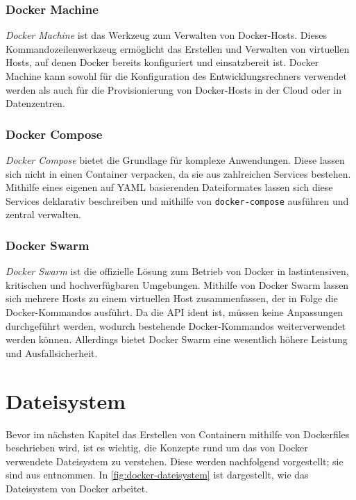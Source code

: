 \subsubsection{Docker Machine}
\label{sec:docker-machine}
\emph{Docker Machine} ist das Werkzeug zum Verwalten von Docker-Hosts.
Dieses Kommandozeilenwerkzeug ermöglicht das Erstellen und Verwalten von virtuellen Hosts, auf denen Docker bereits konfiguriert und einsatzbereit ist.
Docker Machine kann sowohl für die Konfiguration des Entwicklungsrechners verwendet werden als auch für die Provisionierung von Docker-Hosts in der Cloud oder in Datenzentren.
\subsubsection{Docker Compose}
\label{sec:docker-compose}
\emph{Docker Compose} bietet die Grundlage für komplexe Anwendungen.
Diese lassen sich nicht in einen Container verpacken, da sie aus zahlreichen Services bestehen.
Mithilfe eines eigenen auf YAML basierenden Dateiformates lassen sich diese Services deklarativ beschreiben und mithilfe von \texttt{docker-compose} ausführen und zentral verwalten.
\subsubsection{Docker Swarm}
\label{sec:docker-swarm}
\emph{Docker Swarm} ist die offizielle Lösung zum Betrieb von Docker in lastintensiven, kritischen und hochverfügbaren Umgebungen.
Mithilfe von Docker Swarm lassen sich mehrere Hosts zu einem virtuellen Host zusammenfassen, der in Folge die Docker-Kommandos ausführt.
Da die API ident ist, müssen keine Anpassungen durchgeführt werden, wodurch bestehende Docker-Kommandos weiterverwendet werden können.
Allerdings bietet Docker Swarm eine wesentlich höhere Leistung und Ausfallsicherheit.


\section{Dateisystem}
\label{sec:dateisystem}
Bevor im nächsten Kapitel das Erstellen von Containern mithilfe von Dockerfiles beschrieben wird, ist es wichtig, die Konzepte rund um das von Docker verwendete Dateisystem zu verstehen.
Diese werden nachfolgend vorgestellt; sie sind aus \autocite{docker-filesystem:online} entnommen.
In \cref{fig:docker-dateisystem} ist dargestellt, wie das Dateisystem von Docker arbeitet.

